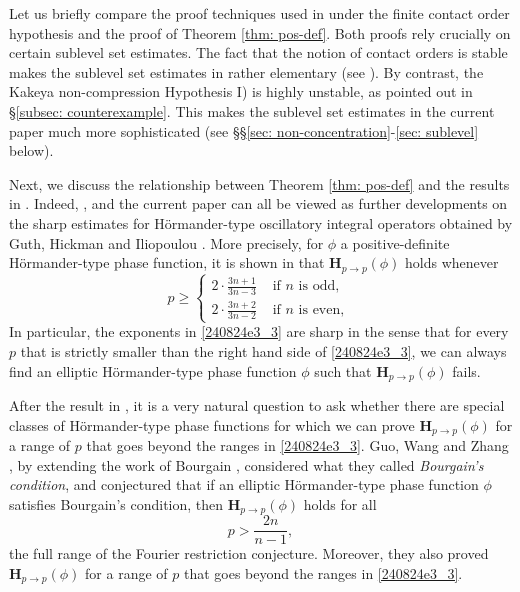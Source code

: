 \documentclass[reqno]{amsart}
\numberwithin{equation}{section}
\newcommand{\bH}{\mathbf{H}}
\theoremstyle{plain}
\theoremstyle{definition}
\begin{document}
Let us briefly compare the proof techniques used in \cite{dai2023oscillatory} under the finite contact order hypothesis and the proof of Theorem \ref{thm: pos-def}. Both proofs rely crucially on certain sublevel set estimates. The fact that the notion of contact orders is stable makes the sublevel set estimates in \cite{dai2023oscillatory} rather elementary (see \cite[\S4.3]{dai2023oscillatory}). By contrast, the Kakeya non-compression Hypothesis I) is highly unstable, as pointed out in \S\ref{subsec: counterexample}. This makes the sublevel set estimates in the current paper much more sophisticated (see \S\S\ref{sec: non-concentration}-\ref{sec: sublevel} below). \medskip


Next, we discuss the relationship between Theorem \ref{thm: pos-def} and the results in \cite{guo2022dichotomy}. Indeed, \cite{guo2022dichotomy}, \cite{dai2023oscillatory} and the current paper can all be viewed as further developments on the sharp estimates for H\"ormander-type oscillatory integral operators obtained by Guth, Hickman and Iliopoulou \cite{GHI2019}. More precisely, for $\phi$ a positive-definite H\"ormander-type phase function, it is shown in \cite{GHI2019} that $\bH_{p\to p}(\phi)$ holds whenever
\begin{equation}\label{240824e3_3}
p \geqslant \begin{cases}2 \cdot \frac{3 n+1}{3 n-3} & \text { if } n \text { is odd, } \\ 2 \cdot \frac{3 n+2}{3 n-2} & \text { if } n \text { is even, }\end{cases}
\end{equation}
 In particular, the exponents in \eqref{240824e3_3} are sharp in the sense that for every $p$ that is strictly smaller than the right hand side of \eqref{240824e3_3}, we can always find an elliptic H\"ormander-type phase function $\phi$ such that $\bH_{p\to p}(\phi)$ fails. 

After the result in \cite{GHI2019}, it is a very natural question to ask whether there are special classes of H\"ormander-type phase functions for which we can prove $\bH_{p\to p}(\phi)$ for a range of $p$ that goes beyond the ranges in \eqref{240824e3_3}. Guo, Wang and Zhang \cite{guo2022dichotomy}, by extending the work of Bourgain \cite{Bourgain1991}, considered what they called \textit{Bourgain's condition}, and conjectured that if an elliptic H\"ormander-type phase function $\phi$ satisfies Bourgain's condition, then $\bH_{p\to p}(\phi)$ holds for all 
\begin{equation}\label{240824e3_5}
    p> \frac{2n}{n-1},
\end{equation}
the full range of the Fourier restriction conjecture. Moreover, they also proved $\bH_{p\to p}(\phi)$ for a range of $p$ that goes beyond the ranges in \eqref{240824e3_3}. 
\end{document}
